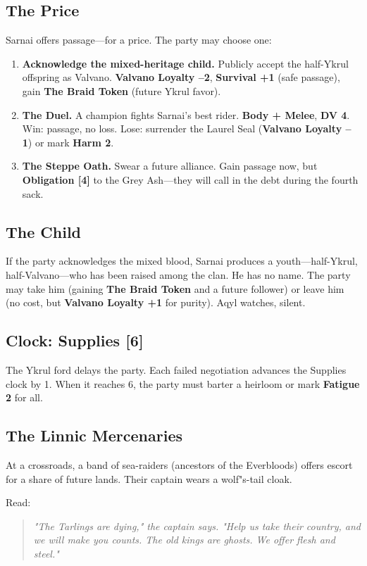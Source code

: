 \documentclass[11pt]{book}
\begin{document}
\subsection*{The Price}
Sarnai offers passage---for a price. The party may choose one:
\begin{enumerate}
    \item \textbf{Acknowledge the mixed-heritage child.} Publicly accept the half-Ykrul offspring as Valvano. \textbf{Valvano Loyalty --2}, \textbf{Survival +1} (safe passage), gain \textbf{The Braid Token} (future Ykrul favor).
    \item \textbf{The Duel.} A champion fights Sarnai's best rider. \textbf{Body + Melee}, \textbf{DV 4}. Win: passage, no loss. Lose: surrender the Laurel Seal (\textbf{Valvano Loyalty --1}) or mark \textbf{Harm 2}.
    \item \textbf{The Steppe Oath.} Swear a future alliance. Gain passage now, but \textbf{Obligation [4]} to the Grey Ash---they will call in the debt during the fourth sack.
\end{enumerate}

\subsection*{The Child}
If the party acknowledges the mixed blood, Sarnai produces a youth---half-Ykrul, half-Valvano---who has been raised among the clan. He has no name. The party may take him (gaining \textbf{The Braid Token} and a future follower) or leave him (no cost, but \textbf{Valvano Loyalty +1} for purity). Aqyl watches, silent.

\subsection*{Clock: Supplies [6]}
The Ykrul ford delays the party. Each failed negotiation advances the Supplies clock by 1. When it reaches 6, the party must barter a heirloom or mark \textbf{Fatigue 2} for all.

\subsection*{The Linnic Mercenaries}
At a crossroads, a band of sea-raiders (ancestors of the Everbloods) offers escort for a share of future lands. Their captain wears a wolf"s-tail cloak.

Read:
\begin{quote}
\emph{"The Tarlings are dying," the captain says. "Help us take their country, and we will make you counts. The old kings are ghosts. We offer flesh and steel."}
\end{quote}
\end{document}
